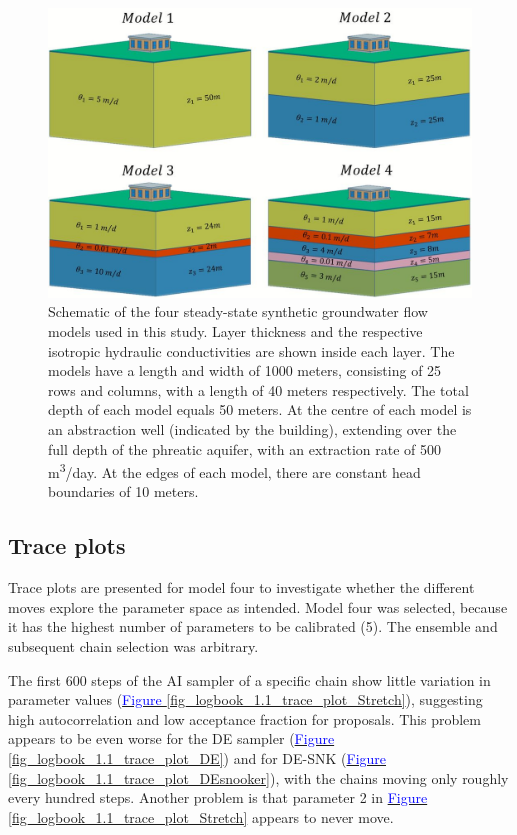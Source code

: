 \begin{figure}[ht]
\centering
\includegraphics[width=1.0\linewidth]{Figures/CONGROMO_NEW4.JPG}
\caption{Schematic of the four steady-state synthetic groundwater flow models used in this study. Layer thickness and the respective isotropic hydraulic conductivities are shown inside each layer. The models have a length and width of 1000 meters, consisting of 25 rows and columns, with a length of 40 meters respectively. The total depth of each model equals 50 meters. At the centre of each model is an abstraction well (indicated by the building), extending over the full depth of the phreatic aquifer, with an extraction rate of 500 m\textsuperscript{3}/day. At the edges of each model, there are constant head boundaries of 10 meters.}\label{fig_logbook_1.0_CONGROMO} %
\end{figure} 

\subsection{Trace plots}\label{trace}
Trace plots are presented for model four to investigate whether the different moves explore the parameter space as intended. Model four was selected, because it has the highest number of parameters to be calibrated (5). The ensemble and subsequent chain selection was arbitrary. 

The first 600 steps of the AI sampler of a specific chain show little variation in parameter values (\hyperref[fig_logbook_1.1_trace_plot_Stretch]{\textcolor{blue}{Figure }\ref{fig_logbook_1.1_trace_plot_Stretch}}), suggesting high autocorrelation and low acceptance fraction for proposals. This problem appears to be even worse for the DE sampler (\hyperref[fig_logbook_1.1_trace_plot_DE]{\textcolor{blue}{Figure }\ref{fig_logbook_1.1_trace_plot_DE}}) and for DE-SNK (\hyperref[fig_logbook_1.1_trace_plot_DEsnooker]{\textcolor{blue}{Figure }\ref{fig_logbook_1.1_trace_plot_DEsnooker}}), with the chains moving only roughly every hundred steps. Another problem is that parameter 2 in \hyperref[fig_logbook_1.1_trace_plot_Stretch]{\textcolor{blue}{Figure }\ref{fig_logbook_1.1_trace_plot_Stretch}} appears to never move. 

